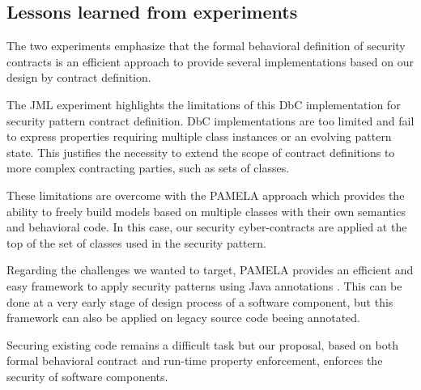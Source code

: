 \subsection{Lessons learned from experiments}

The two experiments emphasize that the formal behavioral definition of security contracts is an efficient approach to provide several implementations based on our design by contract definition.

The JML experiment highlights the limitations of this DbC implementation for security pattern contract definition. DbC implementations are too limited and fail to express properties requiring multiple class instances or an evolving pattern state. This justifies  the necessity to extend the scope of contract definitions to more complex contracting parties, such as sets of classes. 

These limitations are overcome with the PAMELA approach which provides the ability to freely build models based on multiple  classes with their own semantics and behavioral code.
In this case, our security cyber-contracts are applied at the top of the set of classes used in the security pattern.  

Regarding the challenges we wanted to target, PAMELA provides an efficient and easy framework to apply security patterns using Java annotations . This can be done at a very early stage of design process of a software component, but this framework can also be applied on legacy source code beeing annotated.

Securing existing code remains a difficult task but our proposal, based on both formal behavioral contract and run-time property enforcement, enforces the security of software components.


